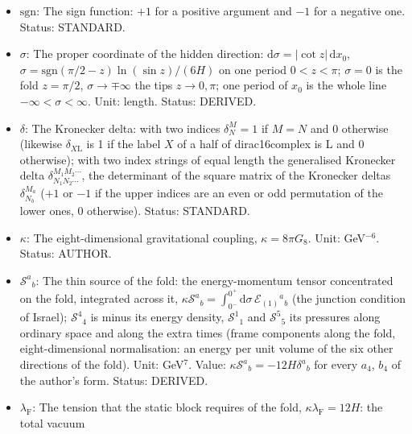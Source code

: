 \documentclass[
  10pt,
]{article}
\begin{document}
\begin{itemize}
  constant \(\Lambda = -21H^2\) and the tension
  \(\kappa\lambda_{\mathrm{F}} = 12H\) of the fold; in UM-4 a free
  parameter, bounded from below by the propagation of the gauge fields
  in the bulk. Unit: GeV (1/length). Value: \(H > 2534\) GeV, about 2.5
  TeV (from the invisible width of the Z boson). Status: AUTHOR.
\item
  \(\mathrm{sgn}\): The sign function: \(+1\) for a positive argument
  and \(-1\) for a negative one. Status: STANDARD.
\item
  \(\sigma\): The proper coordinate of the hidden direction:
  \(\mathrm{d}\sigma = \lvert\cot z\rvert\,\mathrm{d}x_0\),
  \(\sigma = \mathrm{sgn}(\pi/2 - z)\ln(\sin z)/(6H)\) on one period
  \(0 < z < \pi\); \(\sigma = 0\) is the fold \(z = \pi/2\),
  \(\sigma \to \mp\infty\) the tips \(z \to 0, \pi\); one period of
  \(x_0\) is the whole line \(-\infty < \sigma < \infty\). Unit: length.
  Status: DERIVED.
\item
  \(\delta\): The Kronecker delta: with two indices \(\delta^M_N = 1\)
  if \(M = N\) and 0 otherwise (likewise \(\delta_{X\mathrm{L}}\) is 1
  if the label \(X\) of a half of dirac16complex is L and 0 otherwise);
  with two index strings of equal length the generalised Kronecker delta
  \(\delta^{M_1M_2\cdots}_{N_1N_2\cdots}\), the determinant of the
  square matrix of the Kronecker deltas \(\delta^{M_a}_{N_b}\) (\(+1\)
  or \(-1\) if the upper indices are an even or odd permutation of the
  lower ones, 0 otherwise). Status: STANDARD.
\item
  \(\kappa\): The eight-dimensional gravitational coupling,
  \(\kappa = 8\pi G_8\). Unit: GeV\(^{-6}\). Status: AUTHOR.
\item
  \(\mathcal{S}^a{}_b\): The thin source of the fold: the
  energy-momentum tensor concentrated on the fold, integrated across it,
  \(\kappa\mathcal{S}^a{}_b = \int_{0^-}^{0^+}\mathrm{d}\sigma\,\mathcal{E}_{(1)}{}^a{}_b\)
  (the junction condition of Israel); \(\mathcal{S}^4{}_4\) is minus its
  energy density, \(\mathcal{S}^1{}_1\) and \(\mathcal{S}^5{}_5\) its
  pressures along ordinary space and along the extra times (frame
  components along the fold, eight-dimensional normalisation: an energy
  per unit volume of the six other directions of the fold). Unit:
  GeV\(^7\). Value: \(\kappa\mathcal{S}^a{}_b = -12H\delta^a{}_b\) for
  every \(a_4\), \(b_4\) of the author's form. Status: DERIVED.
\item
  \(\lambda_{\mathrm{F}}\): The tension that the static block requires
  of the fold, \(\kappa\lambda_{\mathrm{F}} = 12H\): the total vacuum

\end{itemize}
\end{document}
